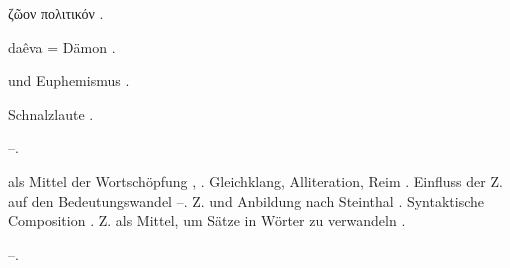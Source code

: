\begin{register}

ζῶον πολιτικόν \pageref{sp.307}.

 daêva = Dämon \pageref{sp.231}.

 und Euphemismus \pageref{sp.249}.


 Schnalzlaute \pageref{sp.269}.



 \pageref{sp.37}–\pageref{sp.38}.

 als Mittel der Wortschöpfung \pageref{sp.41}, \pageref{sp.346}. Gleichklang, Alliteration, Reim \pageref{sp.222}. Einfluss der Z. auf den Bedeutungswandel \pageref{sp.234}–\pageref{sp.237}. Z. und Anbildung nach Steinthal \pageref{sp.337}. Syntaktische Composition \pageref{sp.359}. Z. als Mittel, um Sätze in Wörter zu verwandeln \pageref{sp.466}.




 \pageref{sp.456}–\pageref{sp.458}.
\end{register}
\clearpage
\chead{}
 